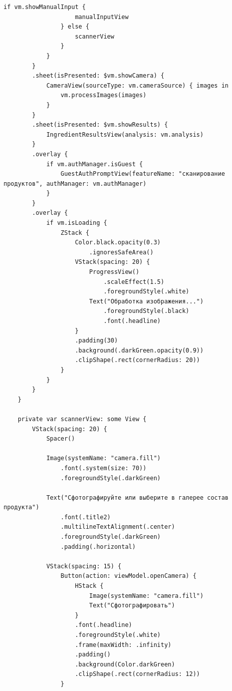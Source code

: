 \begin{lstlisting}[basicstyle=\tiny\ttfamily,breaklines=true]
                if vm.showManualInput {
                    manualInputView
                } else {
                    scannerView
                }
            }
        }
        .sheet(isPresented: $vm.showCamera) {
            CameraView(sourceType: vm.cameraSource) { images in
                vm.processImages(images)
            }
        }
        .sheet(isPresented: $vm.showResults) {
            IngredientResultsView(analysis: vm.analysis)
        }
        .overlay {
            if vm.authManager.isGuest {
                GuestAuthPromptView(featureName: "сканирование продуктов", authManager: vm.authManager)
            }
        }
        .overlay {
            if vm.isLoading {
                ZStack {
                    Color.black.opacity(0.3)
                        .ignoresSafeArea()
                    VStack(spacing: 20) {
                        ProgressView()
                            .scaleEffect(1.5)
                            .foregroundStyle(.white)
                        Text("Обработка изображения...")
                            .foregroundStyle(.black)
                            .font(.headline)
                    }
                    .padding(30)
                    .background(.darkGreen.opacity(0.9))
                    .clipShape(.rect(cornerRadius: 20))
                }
            }
        }
    }
    
    private var scannerView: some View {
        VStack(spacing: 20) {
            Spacer()
            
            Image(systemName: "camera.fill")
                .font(.system(size: 70))
                .foregroundStyle(.darkGreen)
            
            Text("Сфотографируйте или выберите в галерее состав продукта")
                .font(.title2)
                .multilineTextAlignment(.center)
                .foregroundStyle(.darkGreen)
                .padding(.horizontal)

            VStack(spacing: 15) {
                Button(action: viewModel.openCamera) {
                    HStack {
                        Image(systemName: "camera.fill")
                        Text("Сфотографировать")
                    }
                    .font(.headline)
                    .foregroundStyle(.white)
                    .frame(maxWidth: .infinity)
                    .padding()
                    .background(Color.darkGreen)
                    .clipShape(.rect(cornerRadius: 12))
                }
                

\end{lstlisting}
